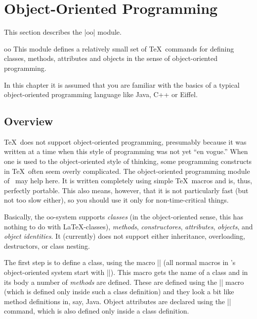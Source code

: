 %
%
%



\section{Object-Oriented Programming}

\label{section-oop}

This section describes the |oo| module.

\begin{pgfmodule}{oo}
  This module defines a relatively small set of \TeX\ commands for
  defining classes, methods, attributes and objects in the sense of
  object-oriented programming. 
\end{pgfmodule}

In this chapter it is assumed that you are familiar with the basics
of a typical object-oriented programming language like Java, C++ or
Eiffel. 



\subsection{Overview}

\TeX\ does not support object-oriented programming, presumably because
it was written at a time when this style of programming was not yet
``en vogue.'' When one is used to the object-oriented style of
thinking, some programming constructs in \TeX\ often seem overly
complicated. The object-oriented programming module of \pgfname\ may
help here. It is written completely using simple \TeX\ macros and is,
thus, perfectly portable. This also means, however, that it is not
particularly fast (but not too slow either), so you should use it only
for non-time-critical things.

Basically, the oo-system supports \emph{classes} (in the
object-oriented sense, this has nothing to do with \LaTeX-classes),
\emph{methods}, \emph{constructores}, \emph{attributes},
\emph{objects}, and \emph{object identities}. It (currently) does not
support either inheritance, overloading, destructors, or class nesting. 

The first step is to define a class, using the macro |\pgfooclass|
(all normal macros in \pgfname's object-oriented system start with 
|\pgfoo|). This macro gets the name of a class and in its body a
number of \emph{methods} are defined. These are defined using the
|\method| macro (which is defined only inside such a class definition)
and they look a bit like method definitions in, say, Java. Object
attributes are declared using the |\attribute| command, which is also
defined only inside a class definition.

